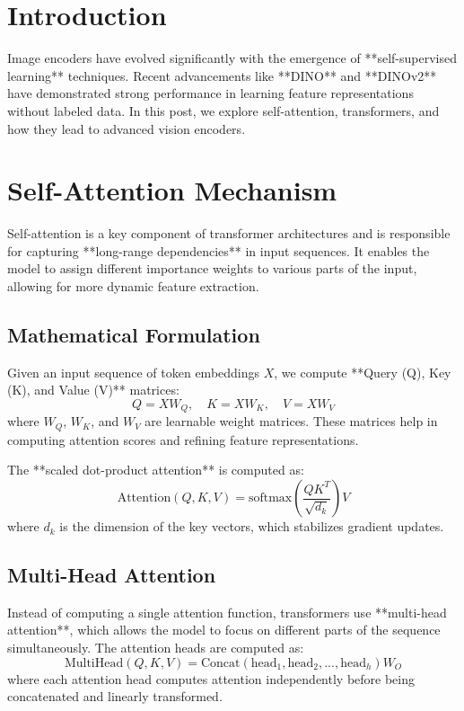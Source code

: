 \documentclass[
]{book}
\begin{document}
\chapter{Introduction}\label{introduction-3}

Image encoders have evolved significantly with the emergence of
**self-supervised learning** techniques. Recent advancements like
**DINO** and **DINOv2** have demonstrated strong performance in
learning feature representations without labeled data. In this post, we
explore self-attention, transformers, and how they lead to advanced
vision encoders.

\chapter{Self-Attention Mechanism}\label{self-attention-mechanism-1}

Self-attention is a key component of transformer architectures and is
responsible for capturing **long-range dependencies** in input
sequences. It enables the model to assign different importance weights
to various parts of the input, allowing for more dynamic feature
extraction.

\section{Mathematical Formulation}\label{mathematical-formulation-1}

Given an input sequence of token embeddings \(X\), we compute **Query
(Q), Key (K), and Value (V)** matrices:
\[Q = XW_Q, \quad K = XW_K, \quad V = XW_V\] where \(W_Q\), \(W_K\), and
\(W_V\) are learnable weight matrices. These matrices help in computing
attention scores and refining feature representations.

The **scaled dot-product attention** is computed as:
\[\text{Attention}(Q, K, V) = \text{softmax} \left( \frac{QK^T}{\sqrt{d_k}} \right) V\]
where \(d_k\) is the dimension of the key vectors, which stabilizes
gradient updates.

\section{Multi-Head Attention}\label{multi-head-attention-1}

Instead of computing a single attention function, transformers use
**multi-head attention**, which allows the model to focus on
different parts of the sequence simultaneously. The attention heads are
computed as:
\[\text{MultiHead}(Q, K, V) = \text{Concat}(\text{head}_1, \text{head}_2, ..., \text{head}_h) W_O\]
where each attention head computes attention independently before being
concatenated and linearly transformed.
\end{document}
